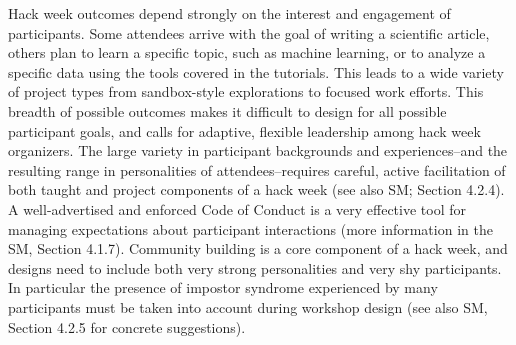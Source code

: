 
Hack week outcomes depend strongly on the interest and engagement of participants.
Some attendees arrive with the goal of writing a scientific article, others plan to learn a specific topic, such as machine learning, or to analyze a specific data using the tools covered in the tutorials.
This leads to a wide variety of project types from sandbox-style explorations to focused work efforts.
This breadth of possible outcomes makes it difficult to design for all possible participant goals, and calls for adaptive, flexible leadership among hack week organizers.
The large variety in participant backgrounds and experiences--and the resulting range in personalities of attendees--requires careful, active facilitation of both taught and project components of a hack week (see also SM; Section 4.2.4). A well-advertised and enforced Code of Conduct is a very effective tool for managing expectations about participant interactions (more information in the SM, Section 4.1.7). 
Community building is a core component of a hack week, and designs need to include both very strong personalities and very shy participants. In particular the presence of impostor syndrome experienced by many participants must be taken into account during workshop design (see also SM, Section 4.2.5 for concrete suggestions).